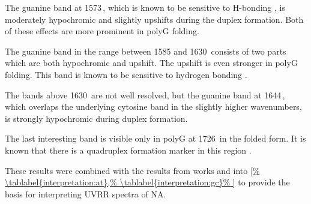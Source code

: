 The guanine band at 1573\,\icm{}, which is known to be sensitive to H-bonding
\parencite{Palacky2013}, is moderately hypochromic and slightly upshifts
during the duplex formation. Both of these effects are more prominent in
polyG folding.

The guanine band in the range between 1585 and 1630\,\icm{} consists of two
parts which are both hypochromic and upshift.
The upshift is even stronger in polyG folding.
This band is known to be sensitive to hydrogen bonding
\parencite{Miura1995}.

The bands above 1630\,\icm{} are not well resolved, but the guanine band at
1644\,\icm{}, which overlaps the underlying cytosine band in the slightly
higher wavenumbers, is strongly hypochromic during duplex formation.

The last interesting band is visible only in polyG at 1726\,\icm{} in the
folded form.
It is known that there is a quadruplex formation marker in this region
\parencite{Palacky2013}.

These results were combined with the results from works
\textcite{Klener2015}
and
\textcite{Klener2021}
into
\cref{%
	\tablabel{interpretation:at},%
	\tablabel{interpretation:gc}%
}
to provide the basis for interpreting UVRR spectra of NA.
